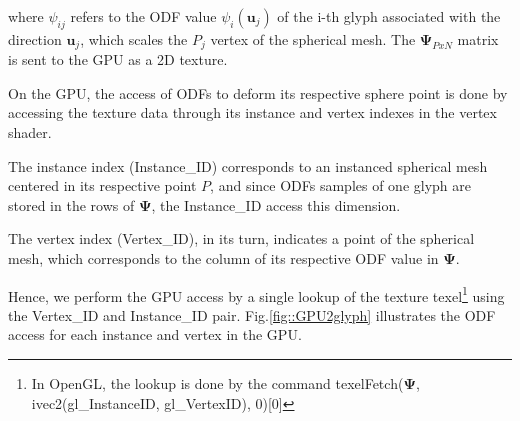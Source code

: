 \documentclass[twoside,twocolumn,10pt]{article}
\begin{document}
where $\psi_{ij}$ refers to the ODF value $\psi_i(\bm{u}_j)$ of the i-th glyph associated with the direction $\bm{u}_j$, which scales the $P_j$ vertex of the spherical mesh. The $\bm{\Psi}_{PxN}$ matrix is sent to the GPU as a 2D texture.

On the GPU, the access of ODFs to deform its respective sphere point is done by accessing the texture data through its instance and vertex indexes in the vertex shader.

The instance index (Instance\_ID) corresponds to an instanced spherical mesh centered in its respective point $P$, and since ODFs samples of one glyph are stored in the rows of $\bm{\Psi}$, the Instance\_ID access this dimension.

The vertex index (Vertex\_ID), in its turn, indicates a point of the spherical mesh, which corresponds to the column of its respective ODF value in $\bm{\Psi}$.

Hence, we perform the GPU access by a single lookup of the texture texel\footnote{In OpenGL, the lookup is done by the command texelFetch($\bm{\Psi}$, ivec2(gl\_InstanceID, gl\_VertexID), 0)[0]} using the Vertex\_ID and Instance\_ID pair. Fig.\ref{fig::GPU2glyph} illustrates the ODF access for each instance and vertex in the GPU.


\end{document}
